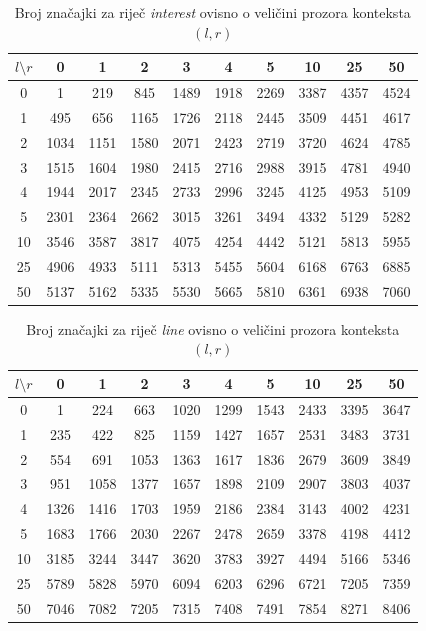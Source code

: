 \documentclass[10pt, a4paper]{article}
\begin{document}
\begin{table}[!hbtp]
\caption{Broj značajki za riječ \emph{interest} ovisno o veličini prozora konteksta $(l,r)$}
\label{tab:interest_feature_set}
\begin{center}
\begin{tabular}{|c|ccccccccc|}
\hline
$l \setminus r$ & 0 & 1 & 2 & 3 & 4 & 5 & 10 & 25 & 50 \\
\hline
0 &  1 &  219 &  845 &  1489 &  1918 &  2269 &  3387 &  4357 &  4524 \\
1 &  495 &  656 &  1165 &  1726 &  2118 &  2445 &  3509 &  4451 &  4617\\
2 &  1034 &  1151 &  1580 &  2071 &  2423 &  2719 &  3720 &  4624 &  4785\\
3 &  1515 &  1604 &  1980 &  2415 &  2716 &  2988 &  3915 &  4781 &  4940\\
4 &  1944 &  2017 &  2345 &  2733 &  2996 &  3245 &  4125 &  4953 &  5109\\
5 &  2301 &  2364 &  2662 &  3015 &  3261 &  3494 &  4332 &  5129 &  5282\\
10 &  3546 &  3587 &  3817 &  4075 &  4254 &  4442 &  5121 &  5813 &  5955\\
25 &  4906 &  4933 &  5111 &  5313 &  5455 &  5604 &  6168 &  6763 &  6885\\
50 &  5137 &  5162 &  5335 &  5530 &  5665 &  5810 &  6361 &  6938 &  7060\\
\hline
\end{tabular}
\end{center}
\end{table}

\begin{table}[!hbtp]
\caption{Broj značajki za riječ \emph{line} ovisno o veličini prozora konteksta $(l,r)$}
\label{tab:line_feature_set}
\begin{center}
\begin{tabular}{|c|ccccccccc|}
\hline
$l \setminus r$ & 0 & 1 & 2 & 3 & 4 & 5 & 10 & 25 & 50 \\
\hline
0  &  1 &  224 &  663 &  1020 &  1299 &  1543 &  2433 &  3395 &  3647\\
1  &  235 &  422 &  825 &  1159 &  1427 &  1657 &  2531 &  3483 &  3731\\
2  &  554 &  691 &  1053 &  1363 &  1617 &  1836 &  2679 &  3609 &  3849\\
3  &  951 &  1058 &  1377 &  1657 &  1898 &  2109 &  2907 &  3803 &  4037\\
4  &  1326 &  1416 &  1703 &  1959 &  2186 &  2384 &  3143 &  4002 &  4231\\
5  &  1683 &  1766 &  2030 &  2267 &  2478 &  2659 &  3378 &  4198 &  4412\\
10 &  3185 &  3244 &  3447 &  3620 &  3783 &  3927 &  4494 &  5166 &  5346\\
25 &  5789 &  5828 &  5970 &  6094 &  6203 &  6296 &  6721 &  7205 &  7359\\
50 &  7046 &  7082 &  7205 &  7315 &  7408 &  7491 &  7854 &  8271 &  8406\\
\hline
\end{tabular}
\end{center}
\end{table}
\end{document}
